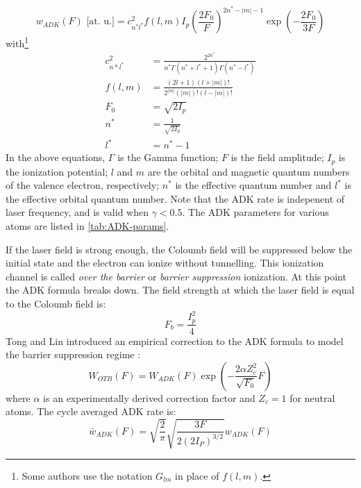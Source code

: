\begin{equation}
w_{ADK}(F) \textrm{ [at. u.]} = c^2_{n^*l^*} f(l,m) I_p \left( \frac{2F_0}{F} \right)^{2n^*-|m|-1} \exp \left( - \frac{2 F_0}{3F} \right)
\label{eqn:ADK-rate}
\end{equation}
with\footnote{Some authors use the notation $G_{lm}$ in place of $f(l,m)$.}
\begin{align}
c_{n*l^*}^2 &= \frac{2^{2n^*}}{n^* \Gamma(n^* + l^* + 1) \Gamma(n^* - l^*)}  \\
f(l,m) &= \frac{(2l+1)(l+|m|)!}{2^{|m|} (|m|)! (l-|m|)!}\\
F_0 &= \sqrt{2 I_p} \\
n^* &= \frac{1}{\sqrt{2I_p}}\\
l^* &= n^* - 1
\end{align}
In the above equations, $\Gamma$ is the Gamma function; $F$ is the field amplitude; $I_p$ is the ionization potential; $l$ and $m$ are the orbital and magnetic quantum numbers of the valence electron, respectively; $n^*$ is the effective quantum number and $l^*$ is the effective orbital quantum number. Note that the ADK rate is indepenent of laser frequency, and is valid when $\gamma < 0.5$. The ADK parameters for various atoms are listed in \cref{tab:ADK-params}.

If the laser field is strong enough, the Coloumb field will be suppressed below the initial state and the electron can ionize without tunnelling. This ionization channel is called \textit{over the barrier} or \textit{barrier suppression} ionization. At this point the ADK formula breaks down. The field strength at which the laser field is equal to the Coloumb field is:
\begin{equation}
F_b = \frac{I_p^2}{4}
\end{equation}
Tong and Lin introduced an empirical correction to the ADK formula to model the barrier suppression regime \cite{tongEmpiricalFormulaStatic2005}:
\begin{equation}
W_{OTB} (F) = W_{ADK} (F) \exp \left( - \frac{2 \alpha Z_c^2}{\sqrt{F_0}} F \right)
\label{eqn:ADK-TL}
\end{equation}
where $\alpha$ is an experimentally derived correction factor and $Z_c=1$ for neutral atoms. The cycle averaged ADK rate is:
\begin{equation}
\bar{w}_{ADK} (F) = \sqrt{\frac{2}{\pi}} \sqrt{\frac{3 F}{2 (2 I_P)^{3/2}}} w_{ADK} (F)
\end{equation}

